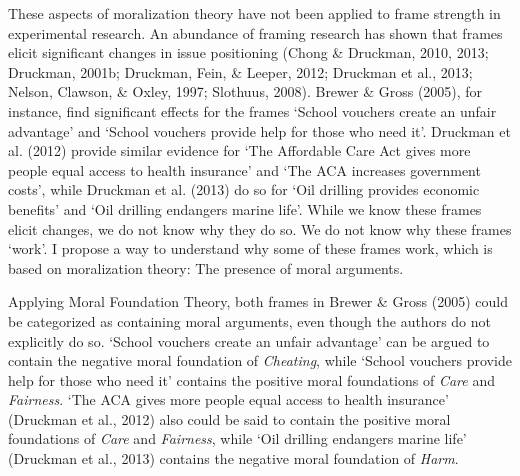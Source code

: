 \documentclass[12pt,econ]{sources/authesis}
\makeatletter
\def\caption{\refstepcounter\@captype \@dblarg{\@caption\@captype}}
\makeatother
\begin{document}
\begin{table}[ht]
\caption{Foundations of Moral Arguments}
\centering
{}
\label{framing-foundations}
\end{table}
These aspects of moralization theory have not been applied to frame strength in experimental research. An abundance of framing research has shown that frames elicit significant changes in issue positioning (Chong \& Druckman, 2010, 2013; Druckman, 2001b; Druckman, Fein, \& Leeper, 2012; Druckman et al., 2013; Nelson, Clawson, \& Oxley, 1997; Slothuus, 2008). Brewer \& Gross (2005), for instance, find significant effects for the frames `School vouchers create an unfair advantage' and `School vouchers provide help for those who need it'. Druckman et al. (2012) provide similar evidence for `The Affordable Care Act gives more people equal access to health insurance' and `The ACA increases government costs', while Druckman et al. (2013) do so for `Oil drilling provides economic benefits' and `Oil drilling endangers marine life'. While we know these frames elicit changes, we do not know why they do so. We do not know why these frames `work'. I propose a way to understand why some of these frames work, which is based on moralization theory: The presence of moral arguments.

Applying Moral Foundation Theory, both frames in Brewer \& Gross (2005) could be categorized as containing moral arguments, even though the authors do not explicitly do so. `School vouchers create an unfair advantage' can be argued to contain the negative moral foundation of \textit{Cheating}, while `School vouchers provide help for those who need it' contains the positive moral foundations of \textit{Care} and \textit{Fairness}. `The ACA gives more people equal access to health insurance' (Druckman et al., 2012) also could be said to contain the positive moral foundations of \textit{Care} and \textit{Fairness}, while `Oil drilling endangers marine life' (Druckman et al., 2013) contains the negative moral foundation of \textit{Harm}.
\end{document}
